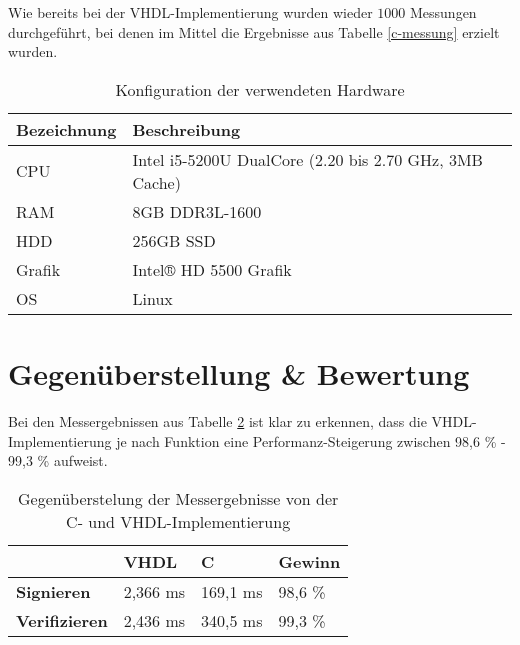 Wie bereits bei der VHDL-Implementierung wurden wieder $1000$ Messungen durchgeführt, bei denen im Mittel die Ergebnisse aus Tabelle \ref{c-messung} erzielt wurden. \\

\begin{table}
	\centering 
	\begin{tabular}{ | l | l | }
		\hline
		Bezeichnung & Beschreibung \\
		\hline
		CPU & Intel i5-5200U DualCore (2.20 bis 2.70 GHz, 3MB Cache) \\ 
		RAM & 8GB DDR3L-1600 \\
		HDD & 256GB SSD  \\
		Grafik & Intel® HD 5500 Grafik \\
		OS & Linux \\
		\hline
	\end{tabular}
	\caption{Konfiguration der verwendeten Hardware}
	\label{c-impl-hardware}
\end{table}


\section{Gegenüberstellung \& Bewertung}
\label{sec:messung-results}

Bei den Messergebnissen aus Tabelle \ref{messung-results} ist klar zu erkennen, dass die VHDL-Implementierung je nach Funktion eine Performanz-Steigerung zwischen 98,6 \% - 99,3 \% aufweist. \\

\begin{table} [h]
	\centering 
	\begin{tabular}{ | p{3cm} | p{2cm} | p{2cm} | p{2cm} | }
		\hline
		 & \textbf{VHDL} & \textbf{C} & \textbf{Gewinn} \\
		\hline
		\textbf{Signieren} & 2,366 ms & 169,1 ms & 98,6 \% \\
		\hline
		\textbf{Verifizieren} &  2,436 ms & 340,5 ms & 99,3 \% \\
		\hline
	\end{tabular}
	\caption{Gegenüberstelung der Messergebnisse von der C- und VHDL-Implementierung}
	\label{messung-results}
\end{table}

